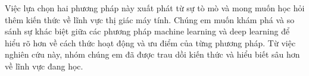 Việc lựa chọn hai phương pháp này xuất phát từ sự tò mò và mong muốn học hỏi thêm kiến thức về lĩnh vực thị giác máy tính. Chúng em muốn khám phá và so sánh sự khác biệt giữa các phương pháp machine learning và deep learning để hiểu rõ hơn về cách thức hoạt động và ưu điểm của từng phương pháp. Từ việc nghiên cứu này, nhóm chúng em đã được trau dồi kiến thức và hiểu biết sâu hơn về lĩnh vực đang học.